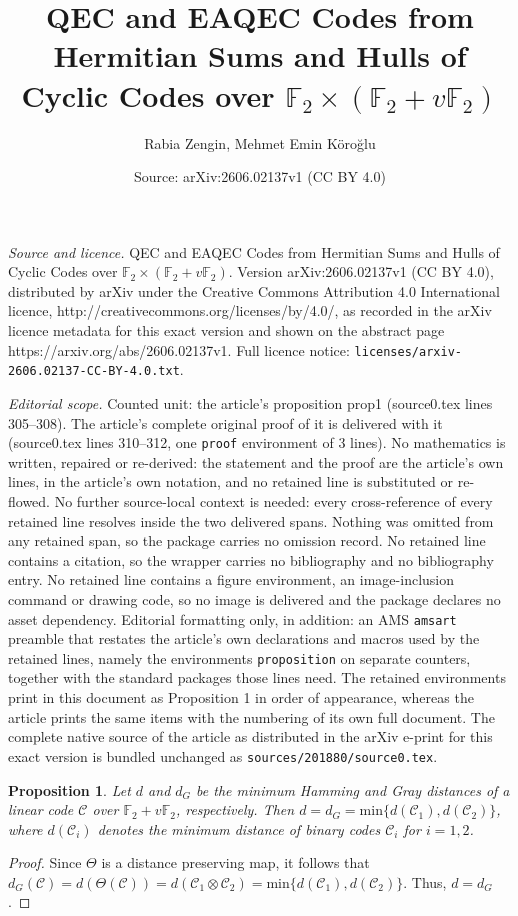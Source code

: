 \documentclass[10pt,a4paper]{amsart}
\title{QEC and EAQEC Codes from Hermitian Sums and Hulls of Cyclic Codes over $\mathbb{F}_2 \times (\mathbb{F}_2+v\mathbb{F}_2)$}
\author{Rabia Zengin, Mehmet Emin K\"oro\u{g}lu}
\date{Source: arXiv:2606.02137v1 (CC BY 4.0)}
\newtheorem{proposition}{Proposition}
\begin{document}
\maketitle

\noindent\emph{Source and licence.} QEC and EAQEC Codes from Hermitian Sums and Hulls of Cyclic Codes over $\mathbb{F}_2 \times (\mathbb{F}_2+v\mathbb{F}_2)$. Version arXiv:2606.02137v1 (CC BY 4.0), distributed by arXiv under the Creative Commons Attribution 4.0 International licence, http://creativecommons.org/licenses/by/4.0/, as recorded in the arXiv licence metadata for this exact version and shown on the abstract page https://arxiv.org/abs/2606.02137v1. Full licence notice: \texttt{licenses/arxiv-2606.02137-CC-BY-4.0.txt}.\par\smallskip

\noindent\textit{Editorial scope.} Counted unit: the article's proposition prop1 (source0.tex lines 305--308). The article's complete original proof of it is delivered with it (source0.tex lines 310--312, one \texttt{proof} environment of 3 lines). No mathematics is written, repaired or re-derived: the statement and the proof are the article's own lines, in the article's own notation, and no retained line is substituted or re-flowed.  No further source-local context is needed: every cross-reference of every retained line resolves inside the two delivered spans.  Nothing was omitted from any retained span, so the package carries no omission record.  No retained line contains a citation, so the wrapper carries no bibliography and no bibliography entry.  No retained line contains a figure environment, an image-inclusion command or drawing code, so no image is delivered and the package declares no asset dependency.  Editorial formatting only, in addition: an AMS \texttt{amsart} preamble that restates the article's own declarations and macros used by the retained lines, namely the environments \texttt{proposition} on separate counters, together with the standard packages those lines need.  The retained environments print in this document as Proposition 1 in order of appearance, whereas the article prints the same items with the numbering of its own full document.  The complete native source of the article as distributed in the arXiv e-print for this exact version is bundled unchanged as \texttt{sources/201880/source0.tex}.
\begin{proposition}\label{prop1}
Let $d$ and $d_G$ be the minimum Hamming and Gray distances of a linear code $\mathcal{C}$ over $\mathbb{F}_2+v\mathbb{F}_2$, respectively. Then $d=d_G=\mathrm{min}\{d(\mathcal{C}_1),d(\mathcal{C}_2)\}$, where $d(\mathcal{C}_i)$ denotes the
minimum distance of binary codes $\mathcal{C}_i$ for $i=1,2$.
\end{proposition}

\begin{proof}
Since $\Theta$ is a distance preserving map, it follows that $d_G(\mathcal{C})=d(\Theta(\mathcal{C}))=d(\mathcal{C}_1 \otimes \mathcal{C}_2)=\mathrm{min}\{d(\mathcal{C}_1),d(\mathcal{C}_2)\}$. Thus, $d=d_G$.
\end{proof}
\end{document}
